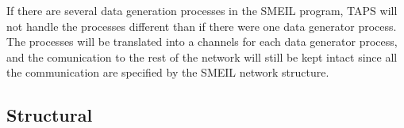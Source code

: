 

If there are several data generation processes in the SMEIL program, TAPS will not handle the processes different than if there were one data generator process. The processes will be translated into a \cspm channels for each data generator process, and the comunication to the rest of the network will still be kept intact since all the communication are specified by the SMEIL network structure.


%
\subsection{Structural}



